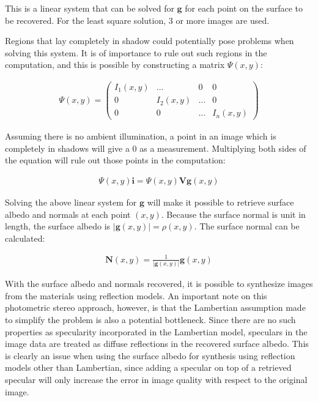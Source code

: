 \noindent This is a linear system that can be solved for $\textbf{g}$ for each point on the surface to be recovered. For the least square solution, 3 or more images are used.

Regions that lay completely in shadow could potentially pose problems when solving this system. It is of importance to rule out such regions in the computation, and this is possible by constructing a matrix $\Psi(x,y)$:

	\begin{eqnarray*}
		\Psi(x,y) = \begin{pmatrix} I_1(x,y) & ... & 0 & 0\\ 
									0 & I_2(x,y) & ... & 0\\ 
									0 & 0 & ... & I_n(x,y) \end{pmatrix}
	\end{eqnarray*}

\noindent Assuming there is no ambient illumination, a point in an image which is completely in shadows will give a 0 as a measurement. Multiplying both sides of the equation will rule out those points in the computation:

	\begin{eqnarray*}
		\Psi(x,y)\textbf{i} = \Psi(x,y)\textbf{V}\textbf{g}(x,y)
	\end{eqnarray*}

\noindent Solving the above linear system for $\textbf{g}$ will make it possible to retrieve surface albedo and normals at each point $(x,y)$. Because the surface normal is unit in length, the surface albedo is $|\textbf{g}(x,y)| = \rho(x,y)$. The surface normal can be calculated:

	\begin{eqnarray*}
		\textbf{N}(x,y) = \frac{1}{|\textbf{g}(x,y)|}\textbf{g}(x,y)
	\end{eqnarray*}

\noindent With the surface albedo and normals recovered, it is possible to synthesize images from the materials using reflection models. An important note on this photometric stereo approach, however, is that the Lambertian assumption made to simplify the problem is also a potential bottleneck. Since there are no such properties as specularity incorporated in the Lambertian model, speculars in the image data are treated as diffuse reflections in the recovered surface albedo. This is clearly an issue when using the surface albedo for synthesis using reflection models other than Lambertian, since adding a specular on top of a retrieved specular will only increase the error in image quality with respect to the original image.


